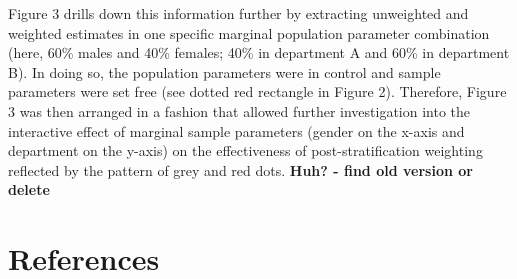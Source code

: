 \documentclass[
  ,man,floatsintext]{apa6}
\begin{document}
Figure 3 drills down this information further by extracting unweighted and weighted estimates in one specific marginal population parameter combination (here, 60\% males and 40\% females; 40\% in department A and 60\% in department B). In doing so, the population parameters were in control and sample parameters were set free (see dotted red rectangle in Figure 2). Therefore, Figure 3 was then arranged in a fashion that allowed further investigation into the interactive effect of marginal sample parameters (gender on the x-axis and department on the y-axis) on the effectiveness of post-stratification weighting reflected by the pattern of grey and red dots. \textbf{Huh? - find old version or delete}

\newpage

\hypertarget{references}{%
\section{References}\label{references}}

\begingroup
\setlength{\parindent}{-0.5in}
\setlength{\leftskip}{0.5in}
\end{document}
